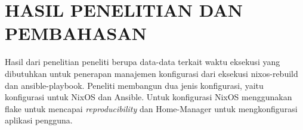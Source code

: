 \documentclass[10pt,]{report}
\begin{document}
%
\chapter{HASIL PENELITIAN DAN PEMBAHASAN}
Hasil dari penelitian peneliti berupa data-data terkait waktu eksekusi yang
dibutuhkan untuk penerapan manajemen konfigurasi dari eksekusi nixos-rebuild
dan ansible-playbook. Peneliti membangun dua jenis konfigurasi, yaitu
konfigurasi untuk NixOS dan Ansible. Untuk konfigurasi NixOS menggunakan flake
untuk mencapai \textit{reproducibility} dan Home-Manager untuk mengkonfigurasi
aplikasi pengguna.
\end{document}

